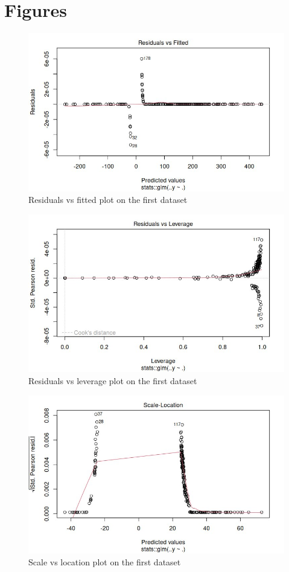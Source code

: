 \documentclass[journal]{IEEEtran}
\begin{document}
\section{Figures}
\begin{figure}[!ht]
    \centering
    \includegraphics[width=.8\linewidth]{images/resfitted_old.jpg}
    \caption{Residuals vs fitted plot on the first dataset}\label{fig:resfitold}
\end{figure}

\begin{figure}[!ht]
    \centering
    \includegraphics[width=.8\linewidth]{images/reslev_old.jpg}
    \caption{Residuals vs leverage plot on the first dataset}\label{fig:reslevold}
\end{figure}

\begin{figure}[!ht]
    \centering
    \includegraphics[width=.8\linewidth]{images/scaleloc_old.jpg}
    \caption{Scale vs location plot on the first dataset}\label{fig:scalelocold}
\end{figure}
\end{document}
